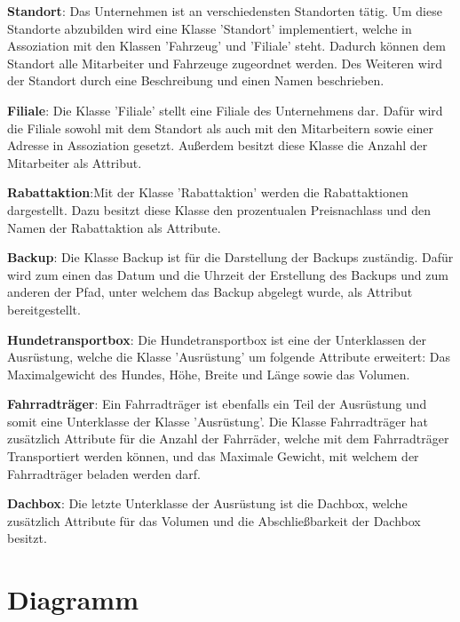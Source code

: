 \textbf{Standort}: Das Unternehmen ist an verschiedensten Standorten tätig. Um diese Standorte abzubilden wird eine Klasse 'Standort' implementiert, welche in Assoziation mit den Klassen 'Fahrzeug' und 'Filiale' steht. Dadurch können dem Standort alle Mitarbeiter und Fahrzeuge zugeordnet werden.
Des Weiteren wird der Standort durch eine Beschreibung und einen Namen beschrieben.

\textbf{Filiale}: Die Klasse 'Filiale' stellt eine Filiale des Unternehmens dar. Dafür wird die Filiale sowohl mit dem Standort als auch mit den Mitarbeitern sowie einer Adresse in Assoziation gesetzt. Außerdem besitzt diese Klasse die Anzahl der Mitarbeiter als Attribut.  

\textbf{Rabattaktion}:Mit der Klasse 'Rabattaktion' werden die Rabattaktionen dargestellt. Dazu besitzt diese Klasse den prozentualen Preisnachlass und den Namen der Rabattaktion als Attribute.

\textbf{Backup}: Die Klasse Backup ist für die Darstellung der Backups zuständig. Dafür wird zum einen das Datum und die Uhrzeit der Erstellung des Backups und zum anderen der Pfad, unter welchem das Backup abgelegt wurde, als Attribut bereitgestellt.

\textbf{Hundetransportbox}: Die Hundetransportbox ist eine der Unterklassen der Ausrüstung, welche die Klasse 'Ausrüstung' um folgende Attribute erweitert: Das Maximalgewicht des Hundes, Höhe, Breite und Länge sowie das Volumen.

\textbf{Fahrradträger}: Ein Fahrradträger ist ebenfalls ein Teil der Ausrüstung und somit eine Unterklasse der Klasse 'Ausrüstung'. Die Klasse Fahrradträger hat zusätzlich Attribute für die Anzahl der Fahrräder, welche mit dem Fahrradträger Transportiert werden können, und das Maximale Gewicht, mit welchem der Fahrradträger beladen werden darf.

\textbf{Dachbox}: Die letzte Unterklasse der Ausrüstung ist die Dachbox, welche zusätzlich Attribute für das Volumen und die Abschließbarkeit der Dachbox besitzt.


\section{Diagramm}